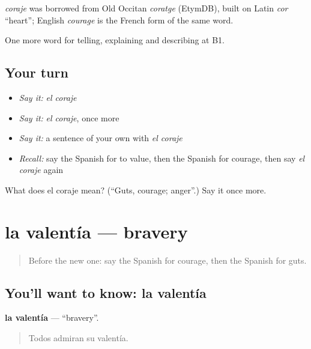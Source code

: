 \begin{cousinweb}
\emph{coraje} was borrowed from Old Occitan \emph{coratge} (EtymDB), built on Latin \emph{cor} \textquotedblleft{}heart\textquotedblright{}; English \emph{courage} is the French form of the same word.
\end{cousinweb}

\begin{grammarlens}[title={What you've built}]
One more word for telling, explaining and describing at B1.
\end{grammarlens}

\subsection*{Your turn}
\begin{itemize}
\raggedright
  \item \emph{Say it:} \emph{el coraje}
  \item \emph{Say it:} \emph{el coraje}, once more
  \item \emph{Say it:} a sentence of your own with \emph{el coraje}
  \item \emph{Recall:} say the Spanish for to value, then the Spanish for courage, then say \emph{el coraje} again
\end{itemize}

\begin{tcolorbox}[breakable,colback=teal!4,colframe=teal!35!black,title={Before you move on}]
What does el coraje mean? (\textquotedblleft{}Guts, courage; anger\textquotedblright{}.) Say it once more.
\end{tcolorbox}
\section[la valentía]{la valentía — bravery}

\label{lesson:ES-C722-valentia}



\begin{quote}
Before the new one: say the Spanish for courage, then the Spanish for guts.
\end{quote}

\subsection*{You'll want to know: la valentía}
\textbf{la valentía} — \textquotedblleft{}bravery\textquotedblright{}.

\begin{quote}
Todos admiran su valentía.
\end{quote}

